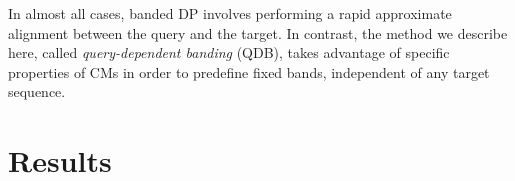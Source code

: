 \documentclass[11pt]{article}
\begin{document}


In almost all cases, banded DP involves performing a rapid approximate
alignment between the query and the target. In contrast, the method we
describe here, called \emph{query-dependent banding} (QDB), takes
advantage of specific properties of CMs in order to predefine fixed
bands, independent of any target sequence.

\section{Results}

\end{document}
